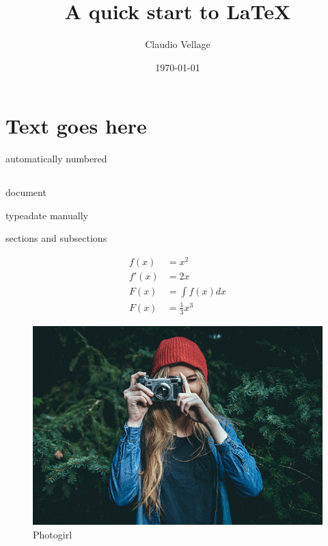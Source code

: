 \documentclass[10pt]{article}
\begin{document}
\section{Text goes here } 
automatically numbered
\subsection {}
\subsubsection {}
\paragraph {} 
\subparagraph {}
\author{ Claudio Vellage }
\title {A quick start to \LaTeX{}} 
document
\date{\today{}} 
typeadate manually
\maketitle{}
\tableofcontents {} 
sections and subsections
\\ 
\newpage{} 

\begin{align}
f(x)  &= x^2\\
f'(x)  &= 2x\\
F(x) &= \int f(x) dx\\
F(x) &= \frac{1}{3}x^3
\end{align}

\begin{figure}
\includegraphics[wicth=0.8\textwidth]{picture/aa.jpg}
\caption{Photogirl}
\end{figure}
\end{document}
